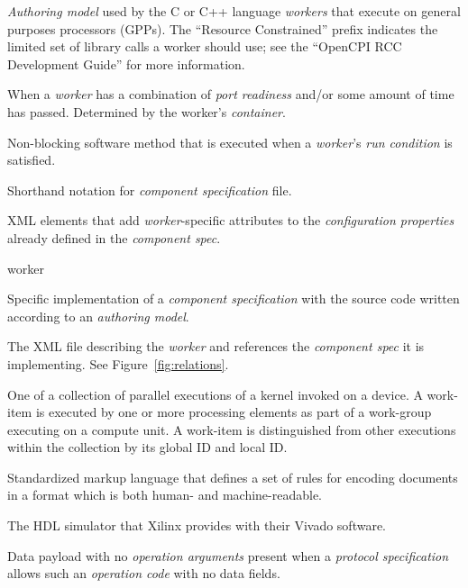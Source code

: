 \documentclass[10pt, a4paper, oneside]{article}
\renewcommand\_{\textunderscore\allowbreak} %
\begin{document}
\begin{description}[style=nextline]
\item[RCC Authoring Model]
\textit{Authoring model} used by the C or C++ language \textit{workers} that execute on general purposes processors (GPPs). The ``Resource Constrained'' prefix indicates the limited set of library calls a worker should use; see the ``OpenCPI RCC Development Guide'' for more information.

\item[Run Condition]
When a \textit{worker} has a combination of \textit{port readiness} and/or some amount of time has passed. Determined by the worker's \textit{container}.

\item[Run Method]
Non-blocking software method that is executed when a \textit{worker}'s \textit{run condition} is satisfied.

\item[Spec file]
Shorthand notation for \textit{component specification} file.

\item[SpecProperty]
XML elements that add \textit{worker}-specific attributes to the \textit{configuration properties} already defined in the \textit{component spec}.

\item [\emph{Worker}]\hypertarget{worker}{worker}
Specific implementation of a \textit{component specification} with the source code written according to an \textit{authoring model}.

\item[Worker Description (OWD)]
The XML file describing the \textit{worker} and references the \textit{component spec} it is implementing. See Figure~\ref{fig:relations}.

 \item[Work-Item]
 One of a collection of parallel executions of a kernel invoked on a device. A work-item is executed by one or more processing elements as part of a work-group executing on a compute unit. A work-item is distinguished from other executions within the collection by its global ID and local ID.

\item[XML]
Standardized markup language that defines a set of rules for encoding documents in a format which is both human- and machine-readable.

\item[xsim] The HDL simulator that Xilinx provides with their Vivado software.

\item[Zero Length Message]
Data payload with no \textit{operation arguments} present when a \textit{protocol specification} allows such an \textit{operation code} with no data fields.

\end{description}
\end{document}
